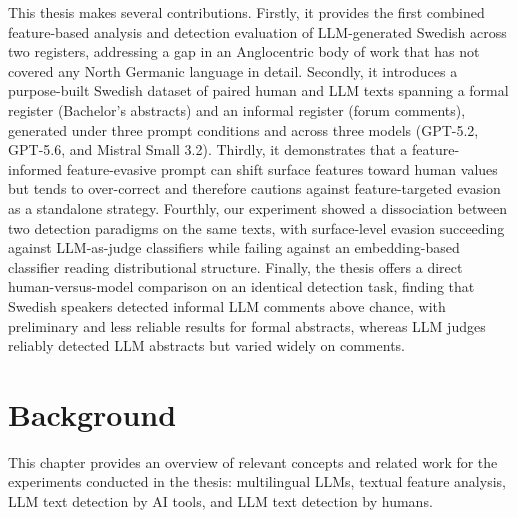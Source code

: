 \documentclass[thesis]{cluu}
\begin{document}
This thesis makes several contributions. Firstly, it provides the first combined feature-based analysis and detection evaluation of LLM-generated Swedish across two registers, addressing a gap in an Anglocentric body of work that has not covered any North Germanic language in detail. Secondly, it introduces a purpose-built Swedish dataset of paired human and LLM texts spanning a formal register (Bachelor's abstracts) and an informal register (forum comments), generated under three prompt conditions and across three models (GPT-5.2, GPT-5.6, and Mistral Small 3.2). Thirdly, it demonstrates that a feature-informed feature-evasive prompt can shift surface features toward human values but tends to over-correct and therefore cautions against feature-targeted evasion as a standalone strategy. Fourthly, our experiment showed a dissociation between two detection paradigms on the same texts, with surface-level evasion succeeding against LLM-as-judge classifiers while failing against an embedding-based classifier reading distributional structure. Finally, the thesis offers a direct human-versus-model comparison on an identical detection task, finding that Swedish speakers detected informal LLM comments above chance, with preliminary and less reliable results for formal abstracts, whereas LLM judges reliably detected LLM abstracts but varied widely on comments.

\chapter{Background}

This chapter provides an overview of relevant concepts and related work for the experiments conducted in the thesis: multilingual LLMs, textual feature analysis, LLM text detection by AI tools, and LLM text detection by humans.
\end{document}
